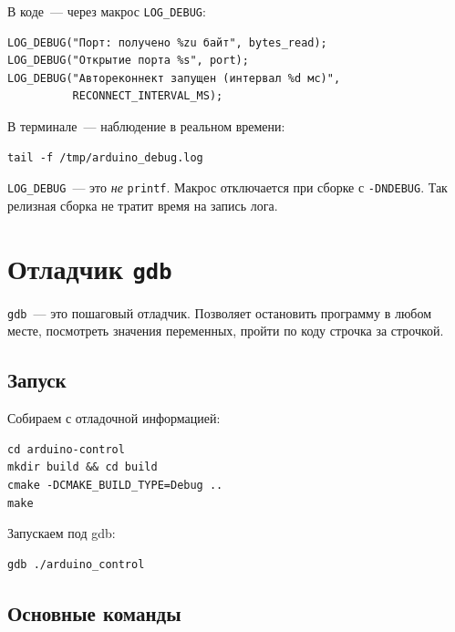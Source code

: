 В коде~--- через макрос \texttt{LOG\_DEBUG}:

\begin{listing}[htbp]
\begin{verbatim}
LOG_DEBUG("Порт: получено %zu байт", bytes_read);
LOG_DEBUG("Открытие порта %s", port);
LOG_DEBUG("Автореконнект запущен (интервал %d мс)",
          RECONNECT_INTERVAL_MS);
\end{verbatim}
\caption{Использование \texttt{LOG\_DEBUG}}
\label{lst:debug-log-usage}
\end{listing}

В терминале~--- наблюдение в реальном
времени:

\begin{verbatim}
tail -f /tmp/arduino_debug.log
\end{verbatim}

\begin{keybox}
\texttt{LOG\_DEBUG}~--- это \emph{не} \texttt{printf}.
Макрос отключается при сборке с
\texttt{-DNDEBUG}. Так релизная сборка не тратит
время на запись лога.
\end{keybox}

\section{Отладчик \texttt{gdb}}
\label{sec:debug-gdb}

\texttt{gdb}~--- это пошаговый отладчик.
Позволяет остановить программу в любом
месте, посмотреть значения переменных,
пройти по коду строчка за строчкой.

\subsection{Запуск}

Собираем с отладочной информацией:

\begin{verbatim}
cd arduino-control
mkdir build && cd build
cmake -DCMAKE_BUILD_TYPE=Debug ..
make
\end{verbatim}

Запускаем под gdb:

\begin{verbatim}
gdb ./arduino_control
\end{verbatim}

\subsection{Основные команды}

